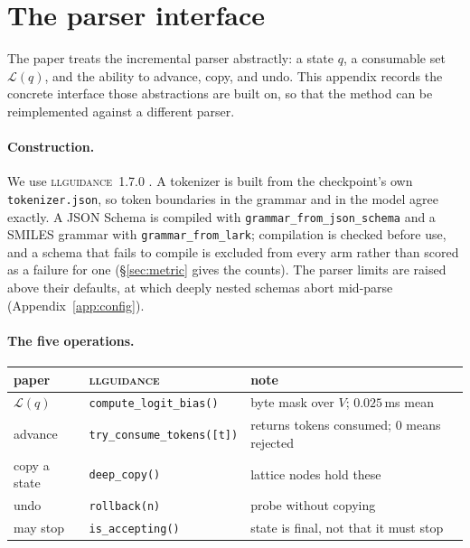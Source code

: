 \section{The parser interface}
\label{app:api}

The paper treats the incremental parser abstractly: a state $q$, a consumable
set $\mathcal{L}(q)$, and the ability to advance, copy, and undo. This appendix
records the concrete interface those abstractions are built on, so that the
method can be reimplemented against a different parser.

\paragraph{Construction.}
We use \textsc{llguidance}~1.7.0 \citep{microsoft2025llguidance}. A tokenizer is
built from the checkpoint's own \texttt{tokenizer.json}, so token boundaries in
the grammar and in the model agree exactly. A JSON Schema is compiled with
\texttt{grammar\_from\_json\_schema} and a SMILES grammar with
\texttt{grammar\_from\_lark}; compilation is checked before use, and a schema
that fails to compile is excluded from every arm rather than scored as a failure
for one (\S\ref{sec:metric} gives the counts). The parser limits are raised above
their defaults, at which deeply nested schemas abort mid-parse
(Appendix~\ref{app:config}).

\paragraph{The five operations.}
\begin{center}
\small
\begin{tabular}{lll}
\toprule
paper & \textsc{llguidance} & note \\
\midrule
$\mathcal{L}(q)$        & \texttt{compute\_logit\_bias()}    & byte mask over $V$; $0.025$\,ms mean \\
advance                 & \texttt{try\_consume\_tokens([t])} & returns tokens consumed; $0$ means rejected \\
copy a state            & \texttt{deep\_copy()}              & lattice nodes hold these \\
undo                    & \texttt{rollback(n)}               & probe without copying \\
may stop                & \texttt{is\_accepting()}           & state is final, not that it must stop \\
\bottomrule
\end{tabular}
\end{center}

